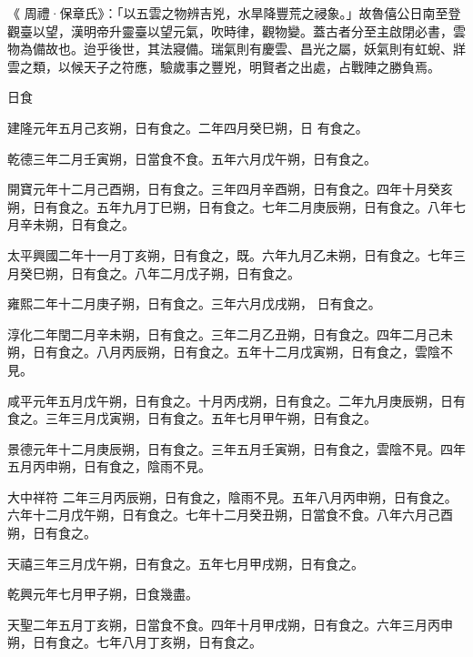 \begin{pinyinscope}
 《
 周禮·保章氏》：「以五雲之物辨吉兇，水旱降豐荒之祲象。」故魯僖公日南至登觀臺以望，漢明帝升靈臺以望元氣，吹時律，觀物變。蓋古者分至主啟閉必書，雲物為備故也。迨乎後世，其法寢備。瑞氣則有慶雲、昌光之屬，妖氣則有虹蜺、牂雲之類，以候天子之符應，驗歲事之豐兇，明賢者之出處，占戰陣之勝負焉。



 日食



 建隆元年五月己亥朔，日有食之。二年四月癸巳朔，日
 有食之。



 乾德三年二月壬寅朔，日當食不食。五年六月戊午朔，日有食之。



 開寶元年十二月己酉朔，日有食之。三年四月辛酉朔，日有食之。四年十月癸亥朔，日有食之。五年九月丁巳朔，日有食之。七年二月庚辰朔，日有食之。八年七月辛未朔，日有食之。



 太平興國二年十一月丁亥朔，日有食之，既。六年九月乙未朔，日有食之。七年三月癸巳朔，日有食之。八年二月戊子朔，日有食之。



 雍熙二年十二月庚子朔，日有食之。三年六月戊戌朔，
 日有食之。



 淳化二年閏二月辛未朔，日有食之。三年二月乙丑朔，日有食之。四年二月己未朔，日有食之。八月丙辰朔，日有食之。五年十二月戊寅朔，日有食之，雲陰不見。



 咸平元年五月戊午朔，日有食之。十月丙戌朔，日有食之。二年九月庚辰朔，日有食之。三年三月戊寅朔，日有食之。五年七月甲午朔，日有食之。



 景德元年十二月庚辰朔，日有食之。三年五月壬寅朔，日有食之，雲陰不見。四年五月丙申朔，日有食之，陰雨不見。



 大中祥符
 二年三月丙辰朔，日有食之，陰雨不見。五年八月丙申朔，日有食之。六年十二月戊午朔，日有食之。七年十二月癸丑朔，日當食不食。八年六月己酉朔，日有食之。



 天禧三年三月戊午朔，日有食之。五年七月甲戌朔，日有食之。



 乾興元年七月甲子朔，日食幾盡。



 天聖二年五月丁亥朔，日當食不食。四年十月甲戌朔，日有食之。六年三月丙申朔，日有食之。七年八月丁亥朔，日有食之。




\end{pinyinscope}
